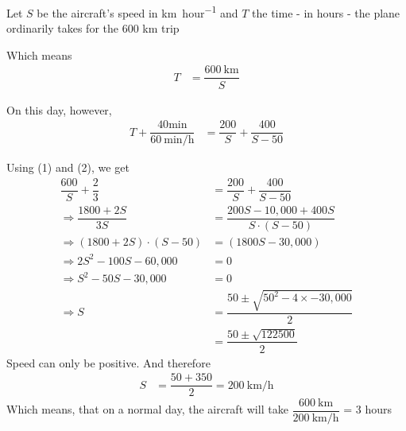 \begin{solution}[\fullpage]
	Let $S$ be the aircraft's speed in \si{km\per hour} and $T$ the time - in hours -
	the plane ordinarily takes for the 600 km trip
	
	Which means
	\begin{align}
		T &= \dfrac{\SI{600}{\kilo\meter}}{S}
	\end{align}
	
	On this day, however,
	\begin{align}
		T + \dfrac{40 \si{\minute}}{\SI{60}{\minute\per\hour}} &= \dfrac{200}{S} + \dfrac{400}{S-50}
	\end{align}
	
	Using (1) and (2), we get 
	\begin{align}
		\dfrac{600}{S} + \dfrac{2}{3} &= \dfrac{200}{S} + \dfrac{400}{S-50} \\
		\Rightarrow \dfrac{1800+2S}{3S} &= \dfrac{200S-10,000+400S}{S\cdot(S-50)} \\
		\Rightarrow (1800+2S)\cdot(S-50) &= (1800S - 30,000) \\
		\Rightarrow 2S^2-100S-60,000 &= 0 \\
		\Rightarrow S^2-50S-30,000 &= 0 \\
		\Rightarrow S &= \dfrac{50\pm\sqrt{50^2-4\times-30,000}}{2} \\
		              &= \dfrac{50\pm\sqrt{122500}}{2}
	\end{align}
	Speed can only be positive. And therefore
	\begin{align}
		S &= \dfrac{50+350}{2} = \SI{200}{\kilo\meter\per\hour}
	\end{align}
	Which means, that on a normal day, the aircraft will take 
	$\dfrac{\SI{600}{\kilo\meter}}{\SI{200}{\kilo\meter\per\hour}}$ = 3 hours
	
\end{solution}
